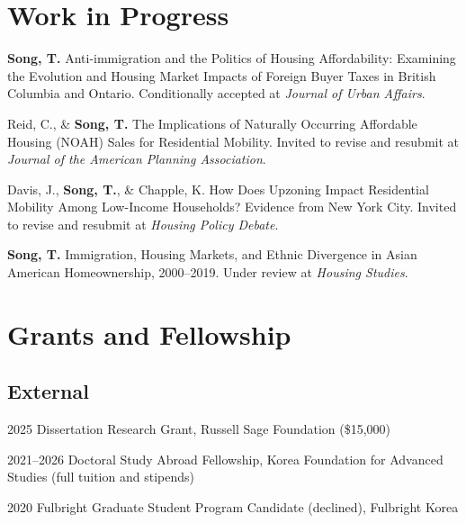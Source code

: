 \documentclass[11pt,letterpaper]{article}
\newcommand{\money}[1]{(\$#1)}
\newcommand{\term}[1]{(#1)}
\begin{document}
\section{Work in Progress}
\begin{subpoints}
  \item \textbf{Song, T.} Anti-immigration and the Politics of Housing Affordability: Examining the Evolution and Housing Market Impacts of Foreign Buyer Taxes in British Columbia and Ontario. Conditionally accepted at \emph{Journal of Urban Affairs}.
  \item Reid, C., \& \textbf{Song, T.} The Implications of Naturally Occurring Affordable Housing (NOAH) Sales for Residential Mobility. Invited to revise and resubmit at \emph{Journal of the American Planning Association}.
  \item Davis, J., \textbf{Song, T.}, \& Chapple, K. How Does Upzoning Impact Residential Mobility Among Low-Income Households? Evidence from New York City. Invited to revise and resubmit at \emph{Housing Policy Debate}.
  \item \textbf{Song, T.} Immigration, Housing Markets, and Ethnic Divergence in Asian American Homeownership, 2000–2019. Under review at \emph{Housing Studies}.
\end{subpoints}

\section{Grants and Fellowship}

\subsection{External}
\begin{tablist}
  \item[2025] \tab{}Dissertation Research Grant, Russell Sage Foundation \money{15,000}
  \item[2021–2026] \tab{}Doctoral Study Abroad Fellowship, Korea Foundation for Advanced Studies \term{full tuition and stipends}
  \item[2020] \tab{}Fulbright Graduate Student Program Candidate \term{declined}, Fulbright Korea
\end{tablist}
\end{document}
